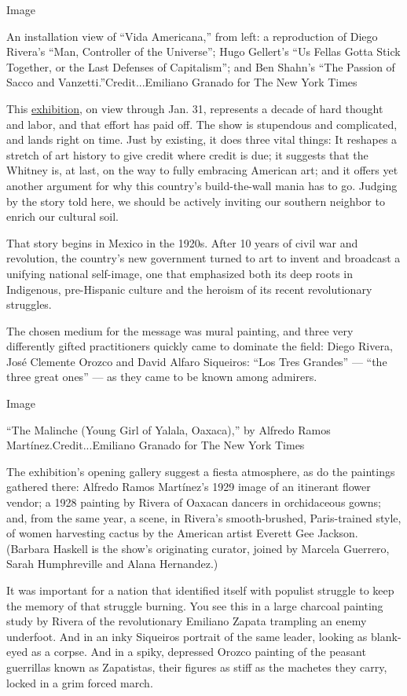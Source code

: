 Image

An installation view of ``Vida Americana,'' from left: a reproduction of
Diego Rivera's ``Man, Controller of the Universe''; Hugo Gellert's ``Us
Fellas Gotta Stick Together, or the Last Defenses of Capitalism''; and
Ben Shahn's ``The Passion of Sacco and Vanzetti.''Credit...Emiliano
Granado for The New York Times

This \href{https://whitney.org/exhibitions/vida-americana}{exhibition},
on view through Jan. 31, represents a decade of hard thought and labor,
and that effort has paid off. The show is stupendous and complicated,
and lands right on time. Just by existing, it does three vital things:
It reshapes a stretch of art history to give credit where credit is due;
it suggests that the Whitney is, at last, on the way to fully embracing
American art; and it offers yet another argument for why this country's
build-the-wall mania has to go. Judging by the story told here, we
should be actively inviting our southern neighbor to enrich our cultural
soil.

That story begins in Mexico in the 1920s. After 10 years of civil war
and revolution, the country's new government turned to art to invent and
broadcast a unifying national self-image, one that emphasized both its
deep roots in Indigenous, pre-Hispanic culture and the heroism of its
recent revolutionary struggles.

The chosen medium for the message was mural painting, and three very
differently gifted practitioners quickly came to dominate the field:
Diego Rivera, José Clemente Orozco and David Alfaro Siqueiros: ``Los
Tres Grandes'' --- ``the three great ones'' --- as they came to be known
among admirers.

Image

``The Malinche (Young Girl of Yalala, Oaxaca),'' by Alfredo Ramos
Martínez.Credit...Emiliano Granado for The New York Times

The exhibition's opening gallery suggest a fiesta atmosphere, as do the
paintings gathered there: Alfredo Ramos Martínez's 1929 image of an
itinerant flower vendor; a 1928 painting by Rivera of Oaxacan dancers in
orchidaceous gowns; and, from the same year, a scene, in Rivera's
smooth-brushed, Paris-trained style, of women harvesting cactus by the
American artist Everett Gee Jackson. (Barbara Haskell is the show's
originating curator, joined by Marcela Guerrero, Sarah Humphreville and
Alana Hernandez.)

It was important for a nation that identified itself with populist
struggle to keep the memory of that struggle burning. You see this in a
large charcoal painting study by Rivera of the revolutionary Emiliano
Zapata trampling an enemy underfoot. And in an inky Siqueiros portrait
of the same leader, looking as blank-eyed as a corpse. And in a spiky,
depressed Orozco painting of the peasant guerrillas known as Zapatistas,
their figures as stiff as the machetes they carry, locked in a grim
forced march.

